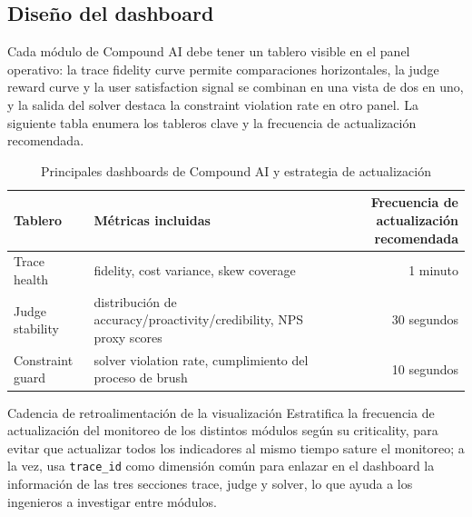 \documentclass[a4paper]{article}
\begin{document}
\subsection{Diseño del dashboard}
Cada módulo de Compound AI debe tener un tablero visible en el panel operativo: la trace fidelity curve permite comparaciones horizontales, la judge reward curve y la user satisfaction signal se combinan en una vista de dos en uno, y la salida del solver destaca la constraint violation rate en otro panel. La siguiente tabla enumera los tableros clave y la frecuencia de actualización recomendada.
\begin{table}[H]
\centering
\begin{tabular}{lp{8cm}r}
\toprule
Tablero & Métricas incluidas & Frecuencia de actualización recomendada \\
\midrule
Trace health & fidelity, cost variance, skew coverage & 1 minuto \\
Judge stability & distribución de accuracy/proactivity/credibility, NPS proxy scores & 30 segundos \\
Constraint guard & solver violation rate, cumplimiento del proceso de brush & 10 segundos \\
\bottomrule
\end{tabular}
\caption{Principales dashboards de Compound AI y estrategia de actualización}
\end{table}
\begin{knowledgebox}{Cadencia de retroalimentación de la visualización}
Estratifica la frecuencia de actualización del monitoreo de los distintos módulos según su criticality, para evitar que actualizar todos los indicadores al mismo tiempo sature el monitoreo; a la vez, usa \texttt{trace\_id} como dimensión común para enlazar en el dashboard la información de las tres secciones trace, judge y solver, lo que ayuda a los ingenieros a investigar entre módulos.
\end{knowledgebox}
\end{document}
